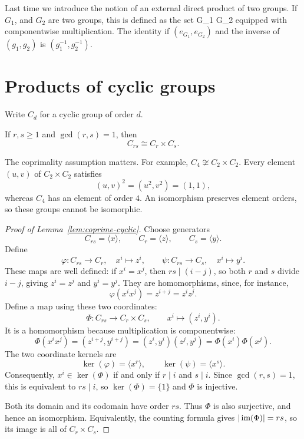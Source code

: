 \documentclass[reqno,11pt]{amsart}
\begin{document}
\raggedbottom
\makelecturetitle

Last time we introduce the notion of an external direct product of two groups. If $G_1$, and $G_2$ are two groups, this is defined as the set \be{} G_1 \times G_2 \ee equipped with componentwise multiplication. The identity if $(e_{G_1}, e_{G_2})$ and the inverse of $(g_1, g_2)$ is $(g_1^{-1}, g_2^{-1})$.


\section{Products of cyclic groups}

Write $C_d$ for a cyclic group of order $d$.

\begin{lemma}\label{lem:coprime-cyclic}
If $r,s\geq1$ and $\gcd(r,s)=1$, then
\[
  C_{rs}\cong C_r\times C_s.
\]
\end{lemma}

\begin{warningbox}
The coprimality assumption matters. For example,
$C_4\not\cong C_2\times C_2$. Every element $(u,v)$ of
$C_2\times C_2$ satisfies
\[
  (u,v)^2=(u^2,v^2)=(1,1),
\]
whereas $C_4$ has an element of order $4$. An isomorphism preserves
element orders, so these groups cannot be isomorphic.
\end{warningbox}

\begin{proof}[Proof of Lemma~\ref{lem:coprime-cyclic}]
Choose generators
\[
  C_{rs}=\langle x\rangle,\qquad C_r=\langle z\rangle,
  \qquad C_s=\langle y\rangle.
\]
Define
\[
  \varphi:C_{rs}\to C_r,\quad x^i\mapsto z^i,
  \qquad
  \psi:C_{rs}\to C_s,\quad x^i\mapsto y^i.
\]
These maps are well defined: if $x^i=x^j$, then $rs\mid(i-j)$,
so both $r$ and $s$ divide $i-j$, giving $z^i=z^j$ and $y^i=y^j$.
They are homomorphisms, since, for instance,
\[
  \varphi(x^ix^j)=z^{i+j}=z^iz^j.
\]
Define a map using these two coordinates:
\[
  \Phi:C_{rs}\longrightarrow C_r\times C_s,
  \qquad x^i\longmapsto(z^i,y^i).
\]
It is a homomorphism because multiplication is componentwise:
\[
  \Phi(x^ix^j)=(z^{i+j},y^{i+j})
  =(z^i,y^i)(z^j,y^j)=\Phi(x^i)\Phi(x^j).
\]
The two coordinate kernels are
\[
  \ker(\varphi)=\langle x^r\rangle,\qquad
  \ker(\psi)=\langle x^s\rangle.
\]
Consequently, $x^i\in\ker(\Phi)$ if and only if $r\mid i$ and
$s\mid i$. Since $\gcd(r,s)=1$, this is equivalent to $rs\mid i$,
so $\ker(\Phi)=\{1\}$ and $\Phi$ is injective.

Both its domain and its codomain have order $rs$. Thus $\Phi$ is also
surjective, and hence an isomorphism. Equivalently, the counting
formula gives $|\operatorname{im}(\Phi)|=rs$, so its image is all of
$C_r\times C_s$.
\end{proof}
\end{document}
